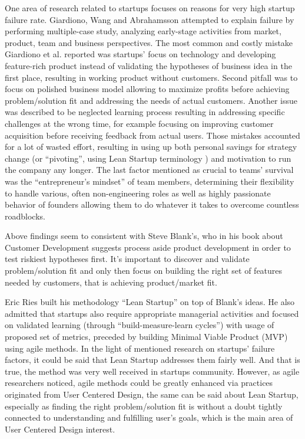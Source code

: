 \documentclass{article}
\begin{document}
One area of research related to startups focuses on reasons for very high startup failure rate. Giardiono, Wang and Abrahamsson \cite{giardino2014early} attempted to explain failure by performing multiple-case study, analyzing early-stage activities from market, product, team and business perspectives. The most common and costly mistake Giardiono et al. reported was startups' focus on technology and developing feature-rich product instead of validating the hypotheses of business idea in the first place, resulting in working product without customers. Second pitfall was to focus on polished business model allowing to maximize profits before achieving problem/solution fit and addressing the needs of actual customers. Another issue was described to be neglected learning process resulting in addressing specific challenges at the wrong time, for example focusing on improving customer acquisition before receiving feedback from actual users. Those mistakes accounted for a lot of wasted effort, resulting in using up both personal savings for strategy change (or ``pivoting'', using Lean Startup terminology \cite{ries2011lean}) and motivation to run the company any longer. The last factor mentioned as crucial to teams' survival was the ``entrepreneur's mindset'' of team members, determining their flexibility to handle various, often non-engineering roles as well as highly passionate behavior of founders allowing them to do whatever it takes to overcome countless roadblocks.

Above findings seem to consistent with Steve Blank's, who in his book about Customer Development \cite{blank2013four} suggests process aside product development in order to test riskiest hypotheses first. It's important to discover and validate problem/solution fit and only then focus on building the right set of features needed by customers, that is achieving product/market fit.

Eric Ries built his methodology ``Lean Startup'' \cite{ries2011lean} on top of Blank's ideas. He also admitted that startups also require appropriate managerial activities and focused on validated learning (through ``build-measure-learn cycles'') with usage of proposed set of metrics, preceded by building Minimal Viable Product (MVP) using agile methods. In the light of mentioned research on startups' failure factors, it could be said that Lean Startup addresses them fairly well. And that is true, the method was very well received in startups community. However, as agile researchers noticed, agile methods could be greatly enhanced via practices originated from User Centered Design, the same can be said about Lean Startup, especially as finding the right problem/solution fit is without a doubt tightly connected to understanding and fulfilling user's goals, which is the main area of User Centered Design interest.
\end{document}
